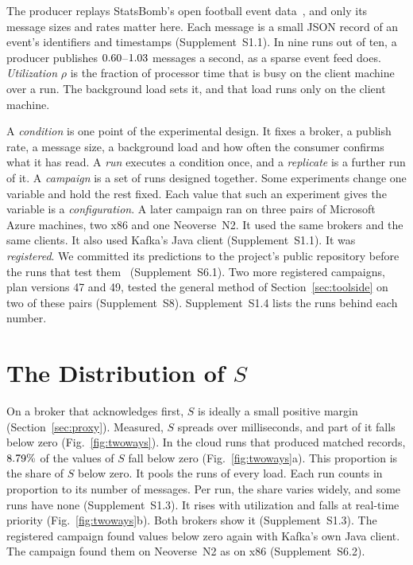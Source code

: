 \documentclass[10pt,journal,compsoc]{IEEEtran}
\newcommand{\kafka}{Kafka}
\begin{document}
The producer replays StatsBomb's open football event data~\cite{statsbomb2023}, and only its
message sizes and rates matter here. Each message is a small JSON record of an event's identifiers and timestamps (Supplement~S1.1). In nine runs out of ten, a producer publishes
$0.60$--$1.03$ messages a second, as a sparse event feed does.   
\emph{Utilization}\label{def:rho} $\rho$ is the
fraction of processor time that is busy on the client machine over a run. The background load sets
it, and that load runs only on the client machine.

\label{def:vocabulary}A \emph{condition} is one point of the experimental design. It fixes a
broker, a publish rate, a message size, a background load and how often the consumer confirms what
it has read. A \emph{run} executes a condition once, and a \emph{replicate} is a further run of it.
A \emph{campaign} is a set of runs designed together. Some experiments change one variable and hold
the rest fixed. Each value that such an experiment gives the variable is a \emph{configuration}. A
later campaign ran on three pairs of Microsoft Azure machines, two x86 and one Neoverse~N2. It used the same brokers and the same clients. It also used \kafka{}'s Java client (Supplement~S1.1). It was \emph{registered}. We
committed its predictions to the project's public repository before the runs that test
them~\cite{nosek2018preregistration} (Supplement~S6.1). Two more registered campaigns, plan versions 47 and 49,
tested the general method of Section~\ref{sec:toolside} on two of these pairs (Supplement~S8). Supplement~S1.4 lists the runs behind each number.


\section{The Distribution of $S$}
\label{sec:finding}

On a broker that acknowledges first, $S$ is ideally a small positive margin
(Section~\ref{sec:proxy}). Measured, $S$ spreads over milliseconds, and part of it falls below zero
(Fig.~\ref{fig:twoways}). In the cloud runs that produced matched records, $8.79\%$ of the values of $S$ fall below zero (Fig.~\ref{fig:twoways}a).  This proportion is the share of $S$ below zero. It pools the runs of every
load. Each run counts in proportion to its number of messages. Per run, the share varies widely, and some runs have none (Supplement~S1.3). It rises with utilization and falls at real-time priority
(Fig.~\ref{fig:twoways}b). Both brokers show it (Supplement~S1.3). The registered campaign found
values below zero again with \kafka{}'s own Java client.  The campaign found them on Neoverse~N2 as on x86 (Supplement~S6.2).
\end{document}
